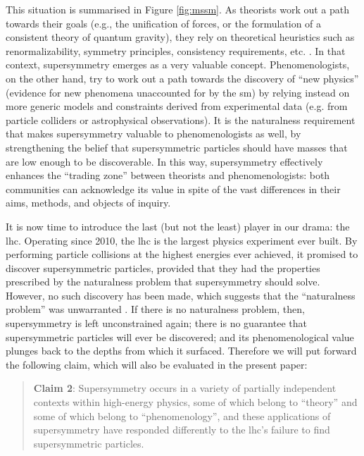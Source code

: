 \documentclass[smallextended]{svjour3}
\begin{document}
This situation is summarised in Figure \ref{fig:mssm}. As theorists work out a path towards their goals (e.g., the unification of forces, or the formulation of a consistent theory of quantum gravity), they rely on theoretical heuristics such as renormalizability, symmetry principles, consistency requirements, etc. \citep{Galison1995}. In that context, supersymmetry emerges as a very valuable concept. Phenomenologists, on the other hand, try to work out a path towards the discovery of ``new physics'' (evidence for new phenomena unaccounted for by the \gls{sm}) by relying instead on more generic models and constraints derived from experimental data (e.g. from particle colliders or astrophysical observations). It is the naturalness requirement that makes supersymmetry valuable to phenomenologists as well, by strengthening the belief that supersymmetric particles should have masses that are low enough to be discoverable. In this way, supersymmetry effectively enhances the ``trading zone'' between theorists and phenomenologists: both communities can acknowledge its value in spite of the vast differences in their aims, methods, and objects of inquiry.%

It is now time to introduce the last (but not the least) player in our drama: the \gls{lhc}. Operating since 2010, the \gls{lhc} is the largest physics experiment ever built. By performing particle collisions at the highest energies ever achieved, it promised to discover supersymmetric particles, provided that they had the properties prescribed by the naturalness problem that supersymmetry should solve. However, no such discovery has been made, which suggests that the ``naturalness problem'' was unwarranted \citep{Giudice2017}. If there is no naturalness problem, then, supersymmetry is left unconstrained again; there is no guarantee that supersymmetric particles will ever be discovered; and its phenomenological value plunges back to the depths from which it surfaced. Therefore we will put forward the following claim, which will also be evaluated in the present paper:

\begin{quote}
    \textbf{Claim 2}: Supersymmetry occurs in a variety of partially independent contexts within high-energy physics, some of which belong to ``theory'' and some of which belong to ``phenomenology'', and these applications of supersymmetry have responded differently to the \gls{lhc}'s failure to find supersymmetric particles.
\end{quote}
\end{document}
